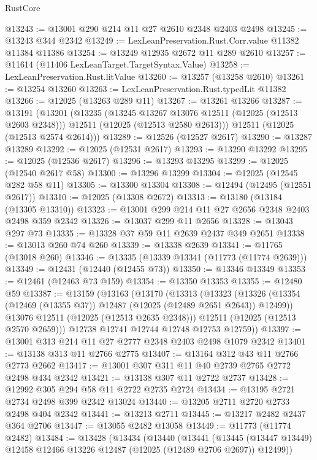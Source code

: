 \begin{lexlean}{RustCore}
\begin{coremodule}
@13243 := @13001 @290 @214 @11 @27 @2610 @2348 @2403 @2498
@13245 := @13243 @344 @2342
@13249 := LexLeanPreservation.Rust.Corr.value @11382 @11384 @11386
@13254 := @13249 @12935 @2672 @11 @289 @2610
@13257 := @11614 (@11406 LexLeanTarget.TargetSyntax.Value)
@13258 := LexLeanPreservation.Rust.litValue
@13260 := @13257 (@13258 @2610)
@13261 := @13254 @13260
@13263 := LexLeanPreservation.Rust.typedLit @11382
@13266 := @12025 (@13263 @289 @11)
@13267 := @13261 @13266
@13287 := @13191
    (@13201
      (@13235
        (@13245 @13267 @13076 @12511 (@12025 (@12513 @2603 @2348)))
        @12511
        (@12025 (@12513 @2580 @2613)))
      @12511
      (@12025 (@12513 @2574 @2614)))
@13289 := @12526 (@12527 @2617)
@13290 := @13287 @13289
@13292 := @12025 (@12531 @2617)
@13293 := @13290 @13292
@13295 := @12025 (@12536 @2617)
@13296 := @13293 @13295
@13299 := @12025 (@12540 @2617 @58)
@13300 := @13296 @13299
@13304 := @12025 (@12545 @282 @58 @11)
@13305 := @13300 @13304
@13308 := @12494 (@12495 (@12551 @2617))
@13310 := @12025 (@13308 @2672)
@13313 := @13180 (@13184 (@13305 @13310))
@13323 := @13001 @299 @214 @11 @27 @2656 @2348 @2403 @2498 @359 @2342
@13326 := @13037 @299 @11 @2656
@13328 := @13043 @297 @73
@13335 := @13328 @37 @59 @11 @2639 @2437 @349 @2651
@13338 := @13013 @260 @74 @260
@13339 := @13338 @2639
@13341 := @11765 (@13018 @260)
@13346 := @13335 (@13339 @13341 (@11773 (@11774 @2639)))
@13349 := @12431 (@12440 (@12455 @73))
@13350 := @13346 @13349
@13353 := @12461 (@12463 @73 @159)
@13354 := @13350 @13353
@13355 := @12480 @59
@13387 := @13159
    (@13163
      (@13170
        (@13313
          (@13323
            (@13326 (@13354 (@12469 (@13355 @37)) @12487 (@12025 (@12489 @2651 @2643)) @12499))
            @13076
            @12511
            (@12025 (@12513 @2635 @2348)))
          @12511
          (@12025 (@12513 @2570 @2659)))
        @12738
        @12741
        @12744
        @12748
        @12753
        @12759))
@13397 := @13001 @313 @214 @11 @27 @2777 @2348 @2403 @2498 @1079 @2342
@13401 := @13138 @313 @11 @2766 @2775
@13407 := @13164 @312 @43 @11 @2766 @2773 @2662
@13417 := @13001 @307 @311 @11 @40 @2739 @2765 @2772 @2498 @434 @2342
@13421 := @13138 @307 @11 @2722 @2737
@13428 := @12992 @305 @294 @58 @11 @2722 @2735 @2724
@13434 := @13195 @2721 @2734 @2498 @399 @2342 @13024
@13440 := @13205 @2711 @2720 @2733 @2498 @404 @2342
@13441 := @13213 @2711
@13445 := @13217 @2482 @2437 @364 @2706
@13447 := @13055 @2482 @13058
@13449 := @11773 (@11774 @2482)
@13484 := @13428
    (@13434
      (@13440
        (@13441
          (@13445 (@13447 @13449) @12458 @12466 @13226 @12487 (@12025 (@12489 @2706 @2697)) @12499))

\end{coremodule}
\end{lexlean}
